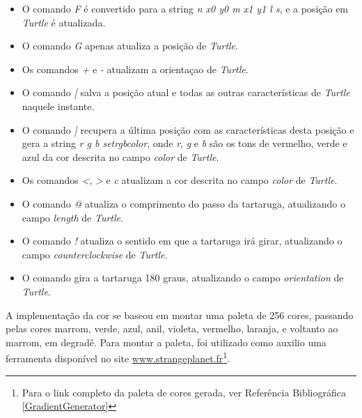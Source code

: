 \documentclass[a4paper,12pt]{article}%
\begin{document}
\begin{itemize}
\item O comando \emph{F} é convertido para a string \emph{n x0 y0 m x1 y1 l s}, e a posição em \emph{Turtle} é atualizada.
\item O comando \emph{G} apenas atualiza a posição de \emph{Turtle}.
\item Os comandos \emph{+} e \emph{-} atualizam a orientaçao de \emph{Turtle}.
\item O comando \emph{[} salva a posição atual e todas as outras características de \emph{Turtle} naquele instante.
\item O comando \emph{]} recupera a última posição com as características desta posição e gera a string \emph{r g b setrgbcolor}, onde 
\emph{r}, \emph{g} e \emph{b} são os tons de vermelho, verde e azul da cor descrita no campo \emph{color} de \emph{Turtle}.
\item Os comandos \emph{\textless}, \emph{\textgreater} e \emph{c} atualizam a cor descrita no campo \emph{color} de \emph{Turtle}.
\item O comando \emph{@} atualiza o comprimento do passo da tartaruga, atualizando o campo \emph{length} de \emph{Turtle}.
\item O comando \emph{!} atualiza o sentido em que a tartaruga irá girar, atualizando o campo \emph{counterclockwise} de \emph{Turtle}.
\item O comando \emph{\textbar} gira a tartaruga 180 graus, atualizando o campo \emph{orientation} de \emph{Turtle}.
\end{itemize}

A implementação da cor se baseou em montar uma paleta de 256 cores, passando pelas cores marrom, verde, azul, anil, violeta, vermelho,
laranja, e voltanto ao marrom, em degradê. Para montar a paleta, foi utilizado como auxilio uma ferramenta disponível no site 
\url{www.strangeplanet.fr}\footnote{Para o link completo da paleta de cores gerada, ver Referência Bibliográfica \ref{GradientGenerator}}.
\end{document}

